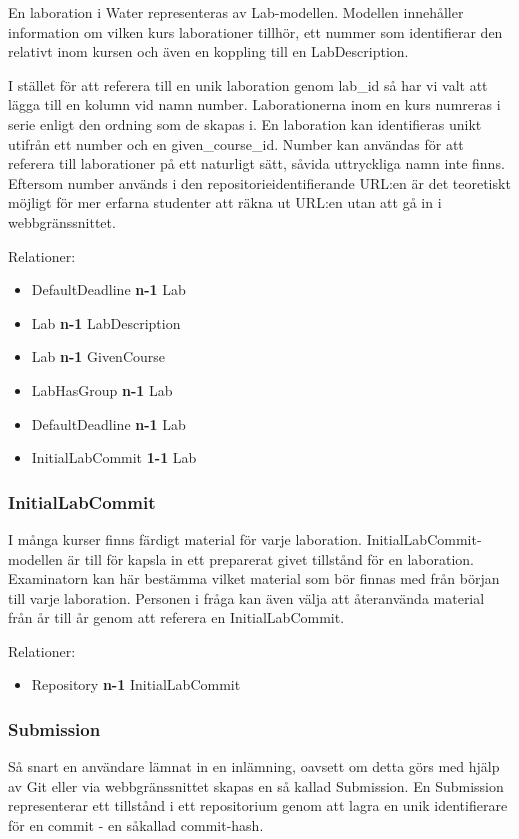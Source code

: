 En laboration i Water representeras av Lab-modellen. Modellen innehåller information om vilken kurs laborationer tillhör, ett nummer som identifierar den relativt inom kursen och även en koppling till en LabDescription.

I stället för att referera till en unik laboration genom lab\_id så har vi valt att lägga till en kolumn vid namn number. Laborationerna inom en kurs numreras i serie enligt den ordning som de skapas i. En laboration kan identifieras unikt utifrån ett number och en given\_course\_id. Number kan användas för att referera till laborationer på ett naturligt sätt, såvida uttryckliga namn inte finns. Eftersom number används i den repositorieidentifierande URL:en är det teoretiskt möjligt för mer erfarna studenter att räkna ut URL:en utan att gå in i webbgränssnittet.

Relationer: 
\begin{itemize}
  \item DefaultDeadline {\bf n-1} Lab
  \item Lab {\bf n-1} LabDescription
  \item Lab {\bf n-1} GivenCourse
  \item LabHasGroup {\bf n-1} Lab
  \item DefaultDeadline {\bf n-1} Lab
  \item InitialLabCommit {\bf 1-1} Lab
\end{itemize}

\subsubsection{InitialLabCommit}
I många kurser finns färdigt material för varje laboration. InitialLabCommit-modellen är till för kapsla in ett preparerat givet tillstånd för en laboration. Examinatorn kan här bestämma vilket material som bör finnas med från början till varje laboration. Personen i fråga kan även välja att återanvända material från år till år genom att referera en InitialLabCommit.

Relationer: 
\begin{itemize}
  \item Repository {\bf n-1} InitialLabCommit 
\end{itemize}

\subsubsection{Submission}
Så snart en användare lämnat in en inlämning, oavsett om detta görs med hjälp av Git eller via webbgränssnittet skapas en så kallad Submission. En Submission representerar ett tillstånd i ett repositorium genom att lagra en unik identifierare för en commit - en såkallad commit-hash.

